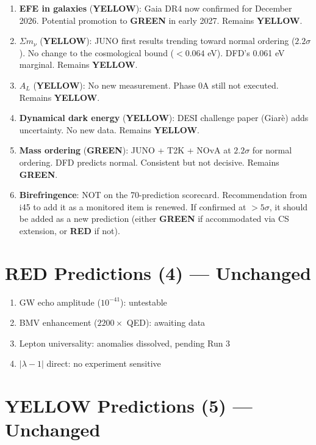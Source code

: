 \documentclass[11pt,a4paper]{article}
\newcommand{\GREEN}{\textcolor{dfdgreen}{\textbf{GREEN}}}
\newcommand{\YELLOW}{\textcolor{dfdyellow}{\textbf{YELLOW}}}
\newcommand{\RED}{\textcolor{dfdred}{\textbf{RED}}}
\begin{document}
\begin{enumerate}
\item \textbf{EFE in galaxies} (\YELLOW): Gaia DR4 now confirmed for December 2026. Potential promotion to \GREEN{} in early 2027. Remains \YELLOW.

\item \textbf{$\Sigma m_\nu$} (\YELLOW): JUNO first results trending toward normal ordering ($2.2\sigma$). No change to the cosmological bound ($< 0.064$ eV). DFD's 0.061 eV marginal. Remains \YELLOW.

\item \textbf{$A_L$} (\YELLOW): No new measurement. Phase 0A still not executed. Remains \YELLOW.

\item \textbf{Dynamical dark energy} (\YELLOW): DESI challenge paper (Giar\`e) adds uncertainty. No new data. Remains \YELLOW.

\item \textbf{Mass ordering} (\GREEN): JUNO + T2K + NOvA at $2.2\sigma$ for normal ordering. DFD predicts normal. Consistent but not decisive. Remains \GREEN.

\item \textbf{Birefringence}: NOT on the 70-prediction scorecard. Recommendation from i45 to add it as a monitored item is renewed. If confirmed at $> 5\sigma$, it should be added as a new prediction (either \GREEN{} if accommodated via CS extension, or \RED{} if not).
\end{enumerate}

\section{RED Predictions (4) --- Unchanged}

\begin{enumerate}
\item GW echo amplitude ($10^{-41}$): untestable
\item BMV enhancement ($2200\times$ QED): awaiting data
\item Lepton universality: anomalies dissolved, pending Run 3
\item $|\lambda-1|$ direct: no experiment sensitive
\end{enumerate}

\section{YELLOW Predictions (5) --- Unchanged}
\end{document}
